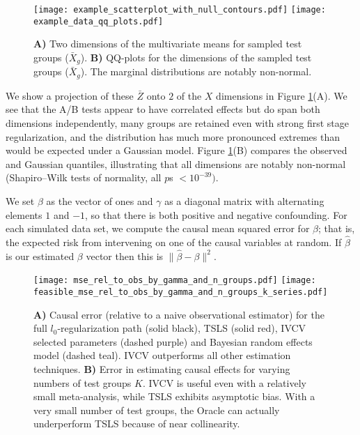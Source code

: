 \documentclass{article}
\begin{document}
\begin{figure}[t]
\begin{center}
	\texttt{[image: example\_scatterplot\_with\_null\_contours.pdf]}
	\texttt{[image: example\_data\_qq\_plots.pdf]}
	\end{center}
	\caption{
	\textbf{A)} Two dimensions of the multivariate means for sampled test groups ($\bar{X}_g$).
	\textbf{B)} QQ-plots for the dimensions of the sampled test groups ($\bar{X}_g$). The marginal distributions are notably non-normal.
	}
	\label{fig:data}
\end{figure}

We show a projection of these $\bar{Z}$ onto $2$ of the $X$ dimensions in Figure \ref{fig:data}(A). We see that the A/B tests appear to have correlated effects but do span both dimensions independently, many groups are retained even with strong first stage regularization, and the distribution has much more pronounced extremes than would be expected under a Gaussian model. Figure \ref{fig:data}(B) compares the observed and Gaussian quantiles, illustrating that all dimensions are notably non-normal (Shapiro--Wilk tests of normality, all $p$s $ < 10^{-39})$.

We set $\beta$ as the vector of ones and $\gamma$ as a diagonal matrix with alternating elements $1$ and $-1$, so that there is both positive and negative confounding. For each simulated data set, we compute the causal mean squared error for $\beta$; that is, the expected risk from intervening on one of the causal variables at random. If $\hat{\beta}$ is our estimated $\beta$ vector then this is $\| \hat{\beta} - \beta \|^2.$

\begin{figure}[t]
\begin{center}
	\texttt{[image: mse\_rel\_to\_obs\_by\_gamma\_and\_n\_groups.pdf]}
	\texttt{[image: feasible\_mse\_rel\_to\_obs\_by\_gamma\_and\_n\_groups\_k\_series.pdf]}
	\end{center}
	\caption{
	\textbf{A)} Causal error (relative to a naive observational estimator) for the full $l_0$-regularization path (solid black), TSLS (solid red), IVCV selected parameters (dashed purple) and Bayesian random effects model (dashed teal). IVCV outperforms all other estimation techniques.
	\textbf{B)} Error in estimating causal effects for varying numbers of test groups $K$. IVCV is useful even with a relatively small meta-analysis, while TSLS exhibits asymptotic bias. With a very small number of test groups, the Oracle can actually underperform TSLS because of near collinearity.
	}
	\label{fig:main_expt}
\end{figure}
\end{document}
